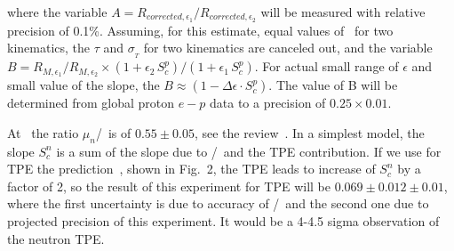 where the variable $A = R_{{corrected},\epsilon_1}/R_{{corrected},\epsilon_2}$ will be measured with relative precision of 0.1\%.  
Assuming, for this estimate, equal values of \qsq~for two kinematics, the  $\tau$ and $\sigma_{_T}$ for two kinematics are canceled out, and the variable
\mbox{$ B = {R_{M,\epsilon_1}}/{R_{M,\epsilon_2}} \times (1+ \epsilon_2 \, S_c^p)/( 1 + \epsilon_1 \, S_c^p)$}.
For actual small range of $\epsilon$ and small value of the slope, the $B \approx (1 - \Delta \epsilon \cdot S_c^p)$.
The value of B will be determined from global proton $e-p$ data to a precision of $0.25 \times 0.01$.
 
At  \gevcsq~the ratio $\mu_n$\gen/\gmn~is of $0.55 \pm 0.05$, see the review~\cite{Punjabi:2015bba}.
%
In a simplest model, the slope $S_c^n$ is a sum of the slope due to \gen/\gmn~and the TPE contribution.
If we use for TPE the prediction~\cite{Blunden:2005ew}, shown in Fig.~2, the TPE leads to increase of $S_c^n$ by a factor of 2,
so the result of this experiment for TPE will be $0.069 \pm 0.012 \pm 0.01$, where the first uncertainty is due to accuracy 
of \gen/\gmn~and the second one due to projected precision of this experiment. It would be a 4-4.5 sigma observation of the neutron TPE.
